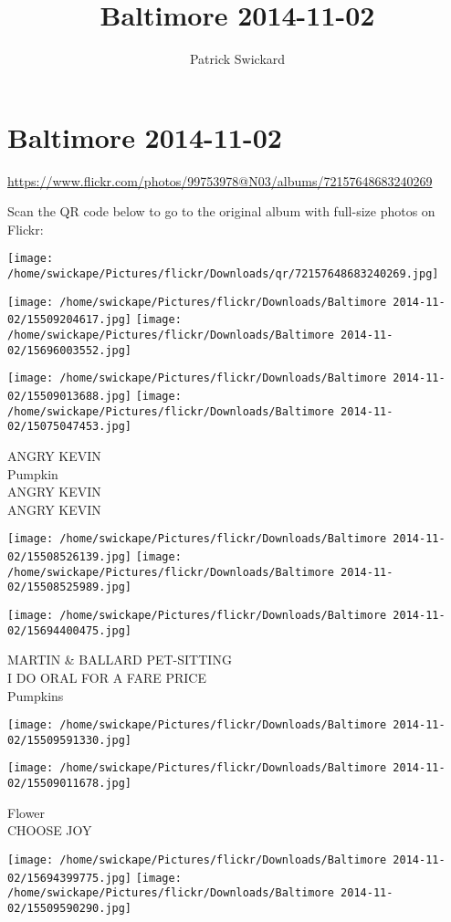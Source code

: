 \documentclass[10pt,letterpaper]{article}
\title{Baltimore 2014-11-02}
\author{Patrick Swickard}
\date{}
\begin{document}
\section*{Baltimore 2014-11-02}

\url{https://www.flickr.com/photos/99753978@N03/albums/72157648683240269}

Scan the QR code below to go to the original album with full-size photos on Flickr:

\texttt{[image: /home/swickape/Pictures/flickr/Downloads/qr/72157648683240269.jpg]}
\pagebreak

\texttt{[image: /home/swickape/Pictures/flickr/Downloads/Baltimore 2014-11-02/15509204617.jpg]}
\texttt{[image: /home/swickape/Pictures/flickr/Downloads/Baltimore 2014-11-02/15696003552.jpg]}

\texttt{[image: /home/swickape/Pictures/flickr/Downloads/Baltimore 2014-11-02/15509013688.jpg]}
\texttt{[image: /home/swickape/Pictures/flickr/Downloads/Baltimore 2014-11-02/15075047453.jpg]}

ANGRY KEVIN\\
Pumpkin\\
ANGRY KEVIN\\
ANGRY KEVIN
\pagebreak

\texttt{[image: /home/swickape/Pictures/flickr/Downloads/Baltimore 2014-11-02/15508526139.jpg]}
\texttt{[image: /home/swickape/Pictures/flickr/Downloads/Baltimore 2014-11-02/15508525989.jpg]}

\vspace{0.25in}
\texttt{[image: /home/swickape/Pictures/flickr/Downloads/Baltimore 2014-11-02/15694400475.jpg]}

MARTIN \& BALLARD PET{-}SITTING\\
I DO ORAL FOR A FARE PRICE\\
Pumpkins
\pagebreak

\texttt{[image: /home/swickape/Pictures/flickr/Downloads/Baltimore 2014-11-02/15509591330.jpg]}

\vspace{0.25in}
\texttt{[image: /home/swickape/Pictures/flickr/Downloads/Baltimore 2014-11-02/15509011678.jpg]}

Flower\\
CHOOSE JOY
\pagebreak

\texttt{[image: /home/swickape/Pictures/flickr/Downloads/Baltimore 2014-11-02/15694399775.jpg]}
\texttt{[image: /home/swickape/Pictures/flickr/Downloads/Baltimore 2014-11-02/15509590290.jpg]}
\end{document}
